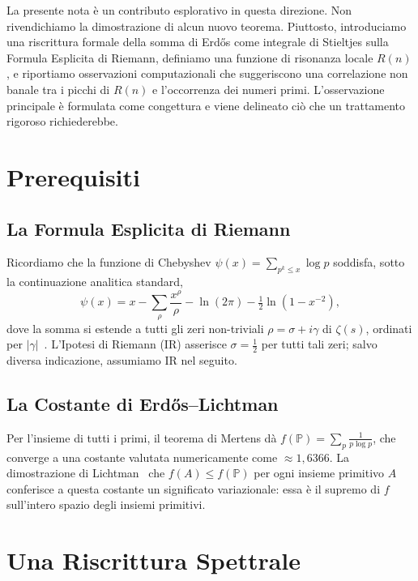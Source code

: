 \documentclass[11pt,a4paper]{article}
\begin{document}
La presente nota \`e un contributo esplorativo in questa direzione. Non rivendichiamo
la dimostrazione di alcun nuovo teorema. Piuttosto, introduciamo una riscrittura
formale della somma di Erd\H{o}s come integrale di Stieltjes sulla Formula Esplicita
di Riemann, definiamo una funzione di risonanza locale $R(n)$, e riportiamo
osservazioni computazionali che suggeriscono una correlazione non banale tra i picchi
di $R(n)$ e l'occorrenza dei numeri primi. L'osservazione principale \`e formulata
come congettura e viene delineato ci\`o che un trattamento rigoroso richiederebbe.

\section{Prerequisiti}

\subsection{La Formula Esplicita di Riemann}

Ricordiamo che la funzione di Chebyshev $\psi(x) = \sum_{p^k \leq x} \log p$
soddisfa, sotto la continuazione analitica standard,
\begin{equation}
  \psi(x) = x - \sum_{\rho} \frac{x^{\rho}}{\rho} - \ln(2\pi)
  - \tfrac{1}{2}\ln(1 - x^{-2}),
  \label{eq:esplicita}
\end{equation}
dove la somma si estende a tutti gli zeri non-triviali $\rho = \sigma + i\gamma$ di
$\zeta(s)$, ordinati per $|\gamma|$~\cite{davenport2000}. L'Ipotesi di Riemann (IR)
asserisce $\sigma = \frac{1}{2}$ per tutti tali zeri; salvo diversa indicazione,
assumiamo IR nel seguito.

\subsection{La Costante di Erd\H{o}s--Lichtman}

Per l'insieme di tutti i primi, il teorema di Mertens d\`a
$f(\mathbb{P}) = \sum_{p} \frac{1}{p \log p}$,
che converge a una costante valutata numericamente come $\approx 1{,}6366$.
La dimostrazione di Lichtman~\cite{lichtman2019} che $f(A) \leq f(\mathbb{P})$
per ogni insieme primitivo $A$ conferisce a questa costante un significato
variazionale: essa \`e il supremo di $f$ sull'intero spazio degli insiemi primitivi.

\section{Una Riscrittura Spettrale}
\end{document}
